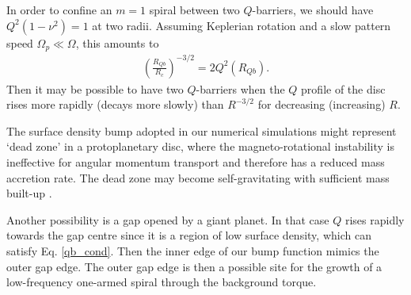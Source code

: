 {  In order to confine an $m=1$ spiral between two $Q$-barriers, we
  should have $Q^2(1-\nu^2)=1$ at two radii. Assuming 
  Keplerian rotation and a slow pattern speed $\Omega_p\ll\Omega$, this amounts to
  \begin{align}\label{qb_cond}
    \left(\frac{R_{Qb}}{R_c}\right)^{-3/2} = 2Q^2(R_{Qb}). 
  \end{align}
  Then it may be possible to have two $Q$-barriers when the $Q$ profile
  of the disc rises more rapidly (decays more slowly) than $R^{-3/2}$
  for decreasing (increasing) $R$. 
  
  The surface density bump adopted in our numerical simulations might
  represent 
  `dead zone' in a protoplanetary
  disc, where the magneto-rotational 
  instability is ineffective for angular momentum transport
  \citep{gammie96,turner08,landry13} and therefore has a reduced mass
  accretion rate. The dead zone may become 
  self-gravitating with sufficient mass built-up
  \citep{armitage01,martin12,martin12b,zhu09,zhu10,zhu10b,bae13,bae14}. 
 
  
  Another possibility is a gap opened by a giant planet. In that case $Q$
  rises rapidly towards the gap centre since it is a region of low
  surface density, which can satisfy Eq. \ref{qb_cond}. Then the inner
  edge of our bump
  function mimics the outer gap edge. The outer gap edge is then a
  possible site for the growth of a low-frequency one-armed spiral
  through the background torque. 

}




